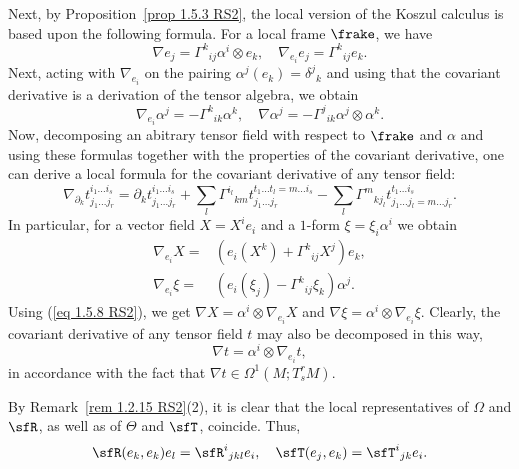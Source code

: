 Next, by Proposition~\ref{prop 1.5.3 RS2}, the local version of the Koszul calculus is based upon the following formula. For a local frame $\frake$, we have 
\[\nabla e_j=\Gamma^k{}_{ij}\alpha^i\otimes e_k, \quad \nabla_{e_i}e_j=\Gamma^k{}_{ij}e_k. \label{eq 2.1.45/46 RS2}\]
Next, acting with $\nabla_{e_i}$ on the pairing $\alpha^j(e_k)=\delta^j{}_k$ and using that the covariant derivative is a derivation of the tensor algebra, we obtain 
\[\nabla_{e_i}\alpha^j=-\Gamma^k{}_{ik}\alpha^k,\quad \nabla\alpha^j=-\Gamma^j{}_{ik}\alpha^j\otimes\alpha^k.\label{eq 2.1.47/48 RS2}\]
Now, decomposing an abitrary tensor field with respect to $\frake$ and $\alpha$ and using these formulas together with the properties of the covariant derivative, one can derive a local formula for the covariant derivative of any tensor field:
\[\nabla_{\partial_k}t_{j_1\ldots j_r}^{i_1\ldots i_s}=\partial_kt_{j_1\ldots j_r}^{i_1\ldots i_s}+\sum_l\Gamma^{i_l}{}_{km}t_{j_1\ldots j_r}^{t_1\ldots t_l=m\ldots i_s}-
\sum_l\Gamma^{m}{}_{kj_l}t_{j_1\ldots j_l=m\ldots  j_r}^{t_1\ldots i_s}.
\]
In particular, for a vector field $X=X^i e_i$ and a $1$-form $\xi=\xi_i\alpha^i$ we obtain 
\begin{align}
    \nabla_{e_i}X=&(e_i(X^k)+\Gamma^k{}_{ij}X^j)e_k,\label{eq 2.1.49 RS2}\\
    \nabla_{e_i}\xi=&(e_i(\xi_j)-\Gamma^k{}_{ij}\xi_k)\alpha^j.\label{eq 2.1.50 RS2}
\end{align}
Using (\ref{eq 1.5.8 RS2}), we get $\nabla X=\alpha^i\otimes\nabla_{e_i}X$ and $\nabla\xi=\alpha^i\otimes\nabla_{e_i}\xi$. Clearly, the covariant derivative of any tensor field $t$ may also be decomposed in this way,
\[\nabla t=\alpha^i\otimes \nabla_{e_i} t,\]
in accordance with the fact that $\nabla t\in\Omega^1(M;T^r_s M)$.

\begin{rem}\label{rem 2.1.28 RS2}
    By Remark~\ref{rem 1.2.15 RS2}(2), it is clear that the local representatives of $\Omega$ and $\sfR$, as well as of $\Theta$ and $\sfT$, coincide. Thus,
    \[\sfR(e_k,e_k)e_l=\sfR^i{}_{jkl}e_i,\quad \sfT(e_j,e_k)=\sfT^i{}_{jk}e_i.\]
\end{rem}

